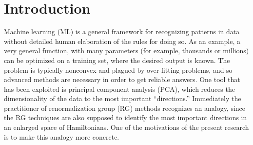 \documentclass[../main.tex]{subfiles}
\begin{document}
\section{Introduction}%
\label{sec:ising_intro}

Machine learning (ML) is a general framework for recognizing patterns in data without detailed human elaboration of the
rules for doing so.
%
As an example, a very general function, with many parameters (for example, thousands or millions) can be optimized on a
training set, where the desired output is known.
%
The problem is typically nonconvex and plagued by over-fitting problems, and so advanced methods are necessary in order
to get reliable answers.
%
One tool that has been exploited is principal component analysis (PCA), which reduces the dimensionality of the data to
the most important ``directions.''  Immediately the practitioner of renormalization group (RG) methods recognizes an
analogy, since the RG techniques are also supposed to identify the most important directions in an enlarged space of
Hamiltonians.
%
One of the motivations of the present research is to make this analogy more concrete.
\end{document}
